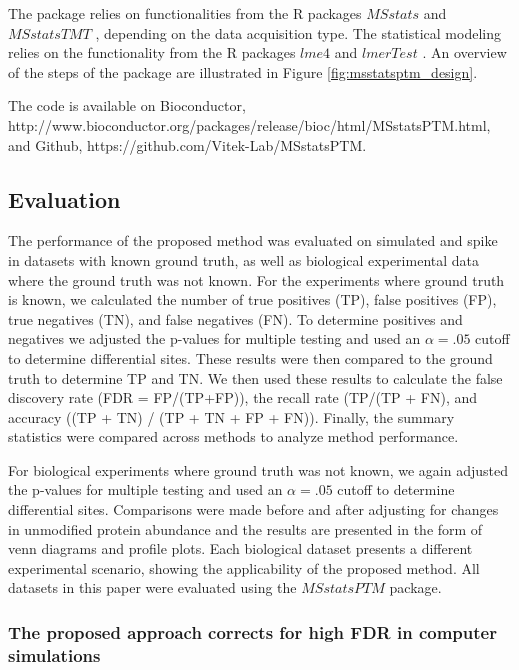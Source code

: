 \documentclass[mcp]{article}
\numberwithin{table}{section}
\begin{document}
The package relies on functionalities from the R packages $MSstats$ \cite{Choi:2014} and $MSstatsTMT$ \cite{Huang:2020}, depending on the data acquisition type. The statistical modeling relies on the functionality from the R packages $lme4$ \cite{Bates2015} and $lmerTest$ \cite{Kuznetsova2017}. An overview of the steps of the package are illustrated in Figure \ref{fig:msstatsptm_design}.

The code is available on Bioconductor, http://www.bioconductor.org/packages/release/bioc/html/MSstatsPTM.html, and Github, https://github.com/Vitek-Lab/MSstatsPTM.

\subsection*{Evaluation}

The performance of the proposed method was evaluated on simulated and spike in datasets with known ground truth, as well as biological experimental data where the ground truth was not known. For the experiments where ground truth is known, we calculated the number of true positives (TP), false positives (FP), true negatives (TN), and false negatives (FN). To determine positives and negatives we adjusted the p-values for multiple testing and used an $\alpha=.05$ cutoff to determine differential sites. These results were then compared to the ground truth to determine TP and TN. We then used these results to calculate the false discovery rate (FDR = FP/(TP+FP)), the recall rate (TP/(TP + FN), and accuracy ((TP + TN) / (TP + TN + FP + FN)). Finally, the summary statistics were compared across methods to analyze method performance. 

For biological experiments where ground truth was not known, we again adjusted the p-values for multiple testing and used an $\alpha=.05$ cutoff to determine differential sites. Comparisons were made before and after adjusting for changes in unmodified protein abundance and the results are presented in the form of venn diagrams and profile plots. Each biological dataset presents a different experimental scenario, showing the applicability of the proposed method. All datasets in this paper were evaluated using the $MSstatsPTM$ package.

\subsubsection*{The proposed approach corrects for high FDR in computer simulations}
\end{document}

